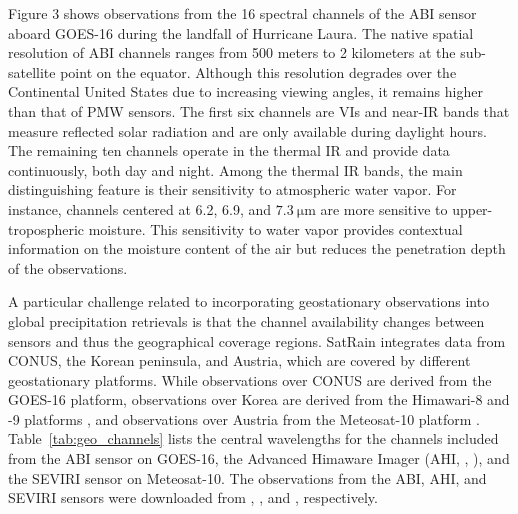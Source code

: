 \documentclass[11pt]{article}
\begin{document}
Figure 3 shows observations from the 16 spectral channels of the ABI sensor
aboard GOES-16 during the landfall of Hurricane Laura. The native spatial
resolution of ABI channels ranges from 500 meters to 2 kilometers at the
sub-satellite point on the equator. Although this resolution degrades over the
Continental United States due to increasing viewing angles, it remains higher
than that of PMW sensors. The first six channels are VIs and near-IR
bands that measure reflected solar radiation and are only available during
daylight hours. The remaining ten channels operate in the thermal IR and provide
data continuously, both day and night. Among the thermal IR bands, the main
distinguishing feature is their sensitivity to atmospheric water vapor. For
instance, channels centered at 6.2, 6.9, and $\SI{7.3}{\micro \meter}$ are more
sensitive to upper-tropospheric moisture. This sensitivity to water vapor
provides contextual information on the moisture content of the air but reduces
the penetration depth of the observations.

A particular challenge related to incorporating geostationary observations into
global precipitation retrievals is that the channel availability changes between
sensors and thus the geographical coverage regions. SatRain integrates data from
CONUS, the Korean peninsula, and Austria, which are covered by different
geostationary platforms. While observations over CONUS are derived from the GOES-16
\citep{Goodman2019Goes} platform, observations over Korea are derived from
the Himawari-8 and -9 platforms \citep{Bessho2016Himawari}, and observations over
Austria from the Meteosat-10 platform \citep{Schmetz2002Introduction}.
Table~\ref{tab:geo_channels} lists the central wavelengths for the channels
included from the ABI sensor on GOES-16, the Advanced Himaware Imager (AHI,
\citeauthor{Da2015Preliminary}, \citeyear{Da2015Preliminary}), and the SEVIRI
\citep{Aminou2002Msg} sensor on Meteosat-10. The observations from the ABI, AHI,
and SEVIRI sensors were downloaded from \cite{NOAA_GOES_AWS},
\cite{NOAA_HIMAWARI_AWS}, and \cite{EUMETSAT_SEVIRI}, respectively.
\end{document}
